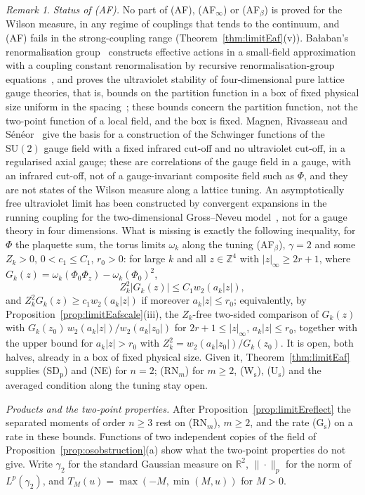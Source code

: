 \documentclass[aps,prd,twocolumn,superscriptaddress,nofootinbib,longbibliography,floatfix,amsmath,amssymb,10pt]{revtex4-2}
\theoremstyle{definition}
\theoremstyle{remark}
\newtheorem{remark}[theorem]{Remark}
\newcommand{\R}{\mathbb{R}}
\newcommand{\Z}{\mathbb{Z}}
\newcommand{\SU}{\mathrm{SU}}
\begin{document}
\begin{remark}\label{rem:limitEafstatus}
\emph{Status of (AF).} No part of (AF), (AF$_\infty$) or (AF$_\beta$) is
proved for the Wilson measure, in any regime of couplings that tends to the
continuum, and (AF) fails in the strong-coupling range
(Theorem~\ref{thm:limitEaf}(v)). Ba{\l}aban's renormalisation
group~\cite{Bal84a,Bal85a,Bal87,Bal88,Bal89b} constructs effective actions in
a small-field approximation with a coupling constant renormalisation by
recursive renormalisation-group equations~\cite{Bal87}, and proves the
ultraviolet stability of four-dimensional pure lattice gauge theories, that
is, bounds on the partition function in a box of fixed physical size uniform
in the spacing~\cite{Bal89b}; these bounds concern the partition function,
not the two-point function of a local field, and the box is fixed.
Magnen, Rivasseau and S\'en\'eor~\cite{MRS93} give the basis for a
construction of the Schwinger functions of the $\SU(2)$ gauge field with a
fixed infrared cut-off and no ultraviolet cut-off, in a regularised axial
gauge; these are correlations of the gauge field in a gauge, with an
infrared cut-off, not of a gauge-invariant composite field such as $\Phi$,
and they are not states of the Wilson measure along a lattice tuning. An
asymptotically free ultraviolet limit has been constructed by convergent
expansions in the running coupling for the two-dimensional Gross--Neveu
model~\cite{GK85}, not for a gauge theory in four dimensions. What is
missing is exactly the following inequality, for $\Phi$ the plaquette sum,
the torus limits $\omega_k$ along the tuning (AF$_\beta$), $\gamma=2$ and
some $Z_k>0$, $0<c_1\le C_1$, $r_0>0$: for large $k$ and all $z\in\Z^4$
with $|z|_\infty\ge2r+1$, where $G_k(z)=\omega_k(\Phi_0\Phi_z)-\omega_k(
\Phi_0)^2$,
\[
Z_k^2|G_k(z)|\le C_1w_2(a_k|z|),
\]
and $Z_k^2G_k(z)\ge c_1w_2(a_k|z|)$ if moreover $a_k|z|\le r_0$;
equivalently, by Proposition~\ref{prop:limitEafscale}(iii), the
$Z_k$-free two-sided comparison of $G_k(z)$ with $G_k(z_0)\,w_2(a_k|z|)/
w_2(a_k|z_0|)$ for $2r+1\le|z|_\infty$, $a_k|z|\le r_0$, together with the
upper bound for $a_k|z|>r_0$ with $Z_k^2=w_2(a_k|z_0|)/G_k(z_0)$. It is open, both halves, already in a box of
fixed physical size. Given it, Theorem~\ref{thm:limitEaf} supplies (SD$_{\mathrm
p}$) and (NE) for $n=2$; (RN$_m$) for $m\ge2$, (W$_{\mathrm s}$),
(U$_{\mathrm s}$) and the averaged condition along the tuning stay open.
\end{remark}

\emph{Products and the two-point properties.} After
Proposition~\ref{prop:limitEreflect} the separated moments of order
$n\ge3$ rest on (RN$_m$), $m\ge2$, and the rate (G$_{\mathrm s}$) on a rate
in these bounds. Functions of two independent copies of the field of
Proposition~\ref{prop:osobstruction}(a) show what the two-point properties do
not give. Write $\gamma_2$ for the standard Gaussian measure on $\R^2$,
$\|\cdot\|_p$ for the norm of $L^p(\gamma_2)$, and $T_M(u)=\max(-M,\min(M,u))$
for $M>0$.
\end{document}
